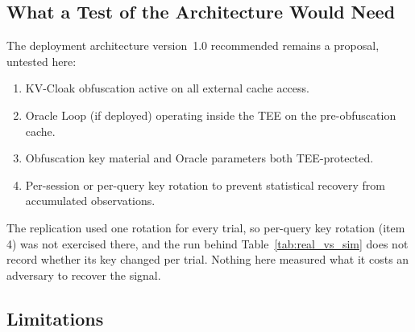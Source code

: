 \subsection{What a Test of the Architecture Would Need}

The deployment architecture version~1.0 recommended remains a proposal,
untested here:

\begin{enumerate}
\item KV-Cloak obfuscation active on all external cache access.
\item Oracle Loop (if deployed) operating inside the TEE on the
pre-obfuscation cache.
\item Obfuscation key material and Oracle parameters both
TEE-protected.
\item Per-session or per-query key rotation to prevent statistical
recovery from accumulated observations.
\end{enumerate}

The replication used one rotation for every trial, so per-query key
rotation (item 4) was not exercised there, and the run behind
Table~\ref{tab:real_vs_sim} does not record whether its key changed per
trial. Nothing here measured what it costs an adversary to recover the
signal.

\subsection{Limitations}


